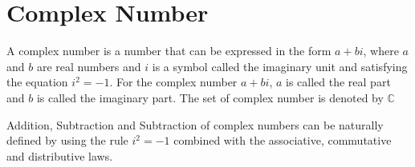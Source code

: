 \documentclass[11pt]{report}
\begin{document}
	\section{Complex Number}
	A complex number is a number that can be expressed in the form $a+bi$, where $a$ and $b$ are real numbers and $i$ is a symbol called the imaginary unit and satisfying the equation $i^2=-1$. For the complex number $a+bi$, $a$ is called the real part and $b$ is called the imaginary part. The set of complex number is denoted by $\mathbb{C}$\\
	\begin{center}
	\end{center}
	Addition, Subtraction and Subtraction of complex numbers can be naturally defined by using the rule $i^2=-1$ combined with the associative, commutative and distributive laws.
	
\end{document}
